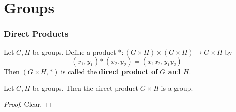 \documentclass{book}
\begin{document}
	
	
	
	
	
	
	
	
	
	
	
	
	
	
	
	
	
	
	
	
	
	
	
	
	
	
	
	
	
	
	
	
	
	
	
	
	
	
	
	
	
	
	
	
	
	
	
	
	
	
	
	
	
	
	
	
	
	
	
	
	
	
	
	
	
	
	
	
	
	
	
	
	
	
	
	\newpage

	
	
	\chapter{Groups}
	
	\subsection{Direct Products}
	
	\begin{defn}
	Let $G,H$ be groups. Define a product $*:(G \times H) \times (G \times H) \rightarrow G \times H$ by 
	$$(x_1,y_1) * (x_2, y_2) = (x_1x_2, y_1y_2)$$
	Then $(G \times H, *)$ is called the \textbf{direct product of $G$ and $H$}.
	\end{defn}	
	
	\begin{ex}
	 Let $G,H$ be groups. Then the direct product $G \times H$ is a group.
	\end{ex}
	\begin{proof}
	Clear.
	\end{proof}
	
\end{document}
